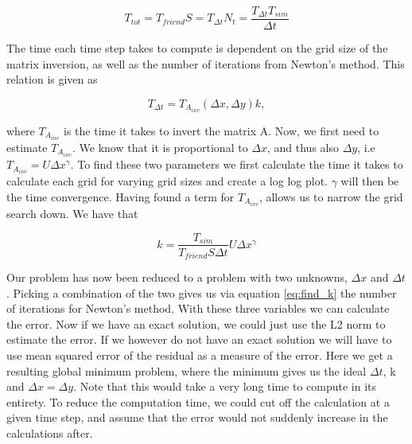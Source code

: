 \documentclass[norsk,a4paper,12pt]{scrartcl}
\begin{document}
\begin{equation*}
    T_{tot} = T_{friend}S = T_{\Delta t}N_t = \frac{T_{\Delta t}T_{sim}}{\Delta t}
\end{equation*}

The time each time step takes to compute is dependent on the grid size of the matrix inversion, as well as the number of iterations from Newton's method. This relation is given as 

\begin{equation*}
    T_{\Delta t} = T_{A_{inv}}(\Delta x, \Delta y)k,
\end{equation*}

where $T_{A_{inv}}$ is the time it takes to invert the matrix A. Now, we first need to estimate $T_{A_{inv}}$. We know that it is proportional to $\Delta x$, and thus also $\Delta y$, i.e $T_{A_{inv}} =U \Delta x^{\gamma}$. To find these two parameters we first calculate the time it takes to calculate each grid for varying grid sizes and create a log log plot. $\gamma$ will then be the time convergence. Having found a term for $T_{A_{inv}}$, allows us to narrow the grid search down. We have that 

\begin{equation}\label{eq:find_k}
    k =\frac{T_{sim}}{T_{friend}S\Delta t}U\Delta x^{\gamma}
\end{equation}

Our problem has now been reduced to a problem with two unknowns, $\Delta x$ and $\Delta t$. Picking a combination of the two gives us via equation \ref{eq:find_k} the number of iterations for Newton's method. With these three variables we can calculate the error. Now if we have an exact solution, we could just use the L2 norm to estimate the error. If we however do not have an exact solution we will have to use mean squared error of the residual as a measure of the error. Here we get a resulting global minimum problem, where the minimum gives us the ideal $\Delta t$, k and $\Delta x = \Delta y$. Note that this would take a very long time to compute in its entirety. To reduce the computation time, we could cut off the calculation at a given time step, and assume that the error would not suddenly increase in the calculations after.  
\end{document}
